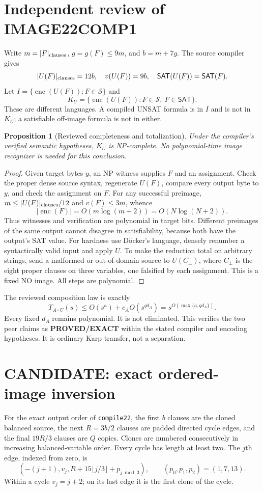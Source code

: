 \documentclass[11pt]{article}
\newtheorem{proposition}[theorem]{Proposition}
\newcommand{\SAT}{\mathsf{SAT}}
\newcommand{\enc}{\operatorname{enc}}
\begin{document}
\section{Independent review of IMAGE22COMP1}
Write $m=|F|_{\rm clauses}$, $g=g(F)\le9m$, and $b=m+7g$.
The source compiler gives
\[
 |U(F)|_{\rm clauses}=12b,\quad v(U(F))=9b,\quad
 \SAT(U(F))=\SAT(F).
\]
Let $I=\{\enc(U(F)):F\in\mathcal S\}$ and
\[
 K_U=\{\enc(U(F)):F\in\mathcal S,\ F\in\SAT\}.
\]
These are different languages. A compiled UNSAT formula is in $I$ and is
not in $K_U$; a satisfiable off-image formula is not in either.

\begin{proposition}[Reviewed completeness and totalization]
Under the compiler's verified semantic hypotheses, $K_U$ is NP-complete.
No polynomial-time image recognizer is needed for this conclusion.
\end{proposition}
\begin{proof}
Given target bytes $y$, an NP witness supplies $F$ and an assignment. Check
the proper dense source syntax, regenerate $U(F)$, compare every output
byte to $y$, and check the assignment on $F$. For any successful preimage,
$m\le |U(F)|_{\rm clauses}/12$ and $v(F)\le3m$, whence
\[
 |\enc(F)|=O(m\log(m+2))=O(N\log(N+2)).
\]
Thus witnesses and verification are polynomial in target bits. Different
preimages of the same output cannot disagree in satisfiability, because
both have the output's SAT value. For hardness use D\"ocker's language,
densely renumber a syntactically valid input and apply $U$. To make the
reduction total on arbitrary strings, send a malformed or out-of-domain
source to $U(C_\bot)$, where $C_\bot$ is the eight proper clauses on three
variables, one falsified by each assignment. This is a fixed NO image.
All steps are polynomial.\qedhere
\end{proof}

The reviewed composition law is exactly
\[
 T_{A\circ U}(s)\le O(s^a)+c_A O(s^{qd_A})
       =s^{O(\max\{a,qd_A\})}.
\]
Every fixed $d_A$ remains polynomial. It is not eliminated. This verifies
the two peer claims as \textbf{PROVED/EXACT} within the stated compiler and
encoding hypotheses. It is ordinary Karp transfer, not a separation.

\section{CANDIDATE: exact ordered-image inversion}
For the exact output order of \texttt{compile22}, the first $b$ clauses are
the cloned balanced source, the next $R=3b/2$ clauses are padded directed
cycle edges, and the final $19R/3$ clauses are $Q$ copies. Clones are numbered
consecutively in increasing balanced-variable order. Every cycle has length
at least two. The $j$th edge, indexed from zero, is
\[
 (-(j+1),v_j,R+15\lfloor j/3\rfloor+p_{j\bmod3}),
 \qquad (p_0,p_1,p_2)=(1,7,13).
\]
Within a cycle $v_j=j+2$; on its last edge it is the first clone of the cycle.
\end{document}
